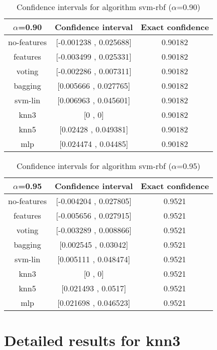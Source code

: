 \documentclass[a4paper,10pt]{article}
\begin{document}
\begin{table}[!htp]
\centering\small
\begin{tabular}{
|c|c|c|}
\hline
 $\alpha$=0.90 & Confidence interval & Exact confidence \\ \hline 
no-features & [-0.001238 , 0.025688] & 0.90182\\ \hline 
features & [-0.003499 , 0.025331] & 0.90182\\ \hline 
voting & [-0.002286 , 0.007311] & 0.90182\\ \hline 
bagging & [0.005666 , 0.027765] & 0.90182\\ \hline 
svm-lin & [0.006963 , 0.045601] & 0.90182\\ \hline 
knn3 & [0 , 0] & 0.90182\\ \hline 
knn5 & [0.02428 , 0.049381] & 0.90182\\ \hline 
mlp & [0.024474 , 0.04485] & 0.90182\\ \hline 

\end{tabular}
\caption{Confidence intervals for algorithm svm-rbf ($\alpha$=0.90)}
\end{table}
\begin{table}[!htp]
\centering\small
\begin{tabular}{
|c|c|c|}
\hline
 $\alpha$=0.95 & Confidence interval & Exact confidence \\ \hline 
no-features & [-0.004204 , 0.027805] & 0.9521\\ \hline 
features & [-0.005656 , 0.027915] & 0.9521\\ \hline 
voting & [-0.003289 , 0.008866] & 0.9521\\ \hline 
bagging & [0.002545 , 0.03042] & 0.9521\\ \hline 
svm-lin & [0.005111 , 0.048474] & 0.9521\\ \hline 
knn3 & [0 , 0] & 0.9521\\ \hline 
knn5 & [0.021493 , 0.0517] & 0.9521\\ \hline 
mlp & [0.021698 , 0.046523] & 0.9521\\ \hline 

\end{tabular}
\caption{Confidence intervals for algorithm svm-rbf ($\alpha$=0.95)}
\end{table}

 \clearpage 


\section{Detailed results for knn3}
\end{document}
